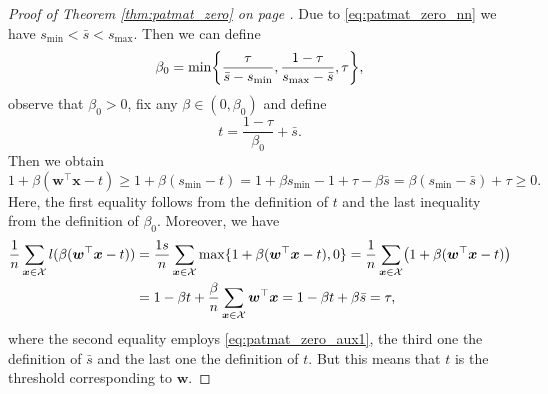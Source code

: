 \begin{proof}[Proof of Theorem \ref{thm:patmat_zero} on page \pageref{thm:patmat_zero}]
  Due to \eqref{eq:patmat_zero_nn} we have $s_{\min} < \bar{s} < s_{\max}$. Then we can define
  \begin{equation*}
    \beta_0 = \min\Brac[c]{\frac{\tau}{\bar{s} - s_{\min}}, \frac{1-\tau}{s_{\max}-\bar{s}}, \tau},
  \end{equation*}
  observe that $\beta_0>0$, fix any $\beta\in(0,\beta_0)$ and define
  \begin{equation*}
    t = \frac{1-\tau}{\beta_0} + \bar{s}.
  \end{equation*}
  Then we obtain
  \begin{equation}\label{eq:patmat_zero_aux1}
    1+\beta(\bm{w}^\top\bm{x}-t) \ge 1+\beta(s_{\min}-t) = 1+\beta s_{\min}-1+\tau - \beta\bar{s} = \beta (s_{\min}-\bar{s})+\tau\ge 0.
  \end{equation}
  Here, the first equality follows from the definition of $t$ and the last inequality from the definition of $\beta_0$. Moreover, we have
  \begin{equation*}
    \begin{aligned}
      \frac{1}{n}\sum_{\bm{x} \in \Xc}l(\beta(\bm{w}^\top\bm{x}-t))
      & = \frac{1s}{n}\sum_{\bm{x} \in \Xc}\max\{1+\beta(\bm{w}^\top\bm{x}-t), 0\}
        = \frac{1}{n}\sum_{\bm{x} \in \Xc}\Brac{1+\beta(\bm{w}^\top\bm{x}-t)} \\
      & = 1-\beta t + \frac{\beta}{n}\sum_{\bm{x} \in \Xc}\bm{w}^\top\bm{x}
        = 1-\beta t + \beta\bar{s} = \tau,
    \end{aligned}
  \end{equation*}
  where the second equality employs \eqref{eq:patmat_zero_aux1}, the third one the definition of $\bar{s}$ and the last one the definition of $t$. But this means that $t$ is the threshold corresponding to $\bm{w}$.
  

\end{proof}
